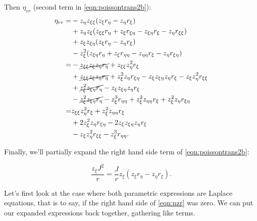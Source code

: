 %
Then \(\eta_{rr}\) (second term in \cref{eqn:poissontrans2b}):
%
\begin{equation}
\begin{aligned}
		\eta_{rr} =& -z_\eta z_{\xi\xi}(z_\xi r_\eta - z_\eta r_\xi) \\
		&+ z_\eta z_\xi (z_{\xi\xi} r_\eta + z_\xi r_{\xi\eta} - z_{\xi\eta} r_\xi - z_\eta r_{\xi\xi} ) \\
		&+ z_\xi z_{\xi\eta}(z_\xi r_\eta - z_\eta r_\xi) \\
		&- z_\xi^2 (z_{\xi\eta} r_\eta + z_\xi r_{\eta\eta} - z_{\eta\eta} r_\xi - z_\eta r_{\xi\eta})\\
		=&- \cancel{z_{\xi\xi} z_\xi z_\eta  r_\eta} + z_{\xi\xi} z_\eta^2 r_\xi \\
		&+  \cancel{z_{\xi\xi} z_\xi z_\eta  r_\eta} + z_\xi^2 z_\eta  r_{\xi\eta} - z_\xi z_{\xi\eta} z_\eta r_\xi - z_\xi z_\eta^2 r_{\xi\xi}  \\
		&+ \cancel{z_\xi^2 z_{\xi\eta} r_\eta} - z_\xi z_{\xi\eta} z_\eta r_\xi \\
		&- \cancel{z_\xi^2 z_{\xi\eta} r_\eta} - z_\xi^3 r_{\eta\eta} + z_\xi^2 z_{\eta\eta} r_\xi + z_\xi^2 z_\eta r_{\xi\eta}\\
		=& z_{\xi\xi} z_\eta^2 r_\xi + z_\xi^2 z_{\eta\eta} r_\xi  \\
		&+ 2z_\xi^2 z_\eta  r_{\xi\eta} - 2z_\xi z_{\xi\eta} z_\eta r_\xi  \\
		&- z_\xi z_\eta^2 r_{\xi\xi} - z_\xi^3 r_{\eta\eta}.
\end{aligned}
\end{equation}

Finally, we'll partially expand the right hand side term of \cref{eqn:poissontrans2b}:

\begin{equation}
\frac{z_\xi J^2}{r} = \frac{J}{r}z_\xi(z_\xi r_\eta - z_\eta r_\xi).
\end{equation}

Let's first look at the case where both parametric expressions are Laplace equations, that is to say, if the right hand side of \cref{eqn:nzr} was zero.
We can put our expanded expressions back together, gathering like terms.

